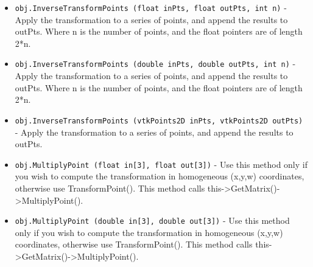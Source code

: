 \begin{itemize}
\item  \verb|obj.InverseTransformPoints (float inPts, float outPts, int n)| -  Apply the transformation to a series of points, and append the
 results to outPts. Where n is the number of points, and the float pointers
 are of length 2*n.

\item  \verb|obj.InverseTransformPoints (double inPts, double outPts, int n)| -  Apply the transformation to a series of points, and append the
 results to outPts. Where n is the number of points, and the float pointers
 are of length 2*n.

\item  \verb|obj.InverseTransformPoints (vtkPoints2D inPts, vtkPoints2D outPts)| -  Apply the transformation to a series of points, and append the
 results to outPts.

\item  \verb|obj.MultiplyPoint (float in[3], float out[3])| -  Use this method only if you wish to compute the transformation in
 homogeneous (x,y,w) coordinates, otherwise use TransformPoint().
 This method calls this->GetMatrix()->MultiplyPoint().

\item  \verb|obj.MultiplyPoint (double in[3], double out[3])| -  Use this method only if you wish to compute the transformation in
 homogeneous (x,y,w) coordinates, otherwise use TransformPoint().
 This method calls this->GetMatrix()->MultiplyPoint().

\end{itemize}

